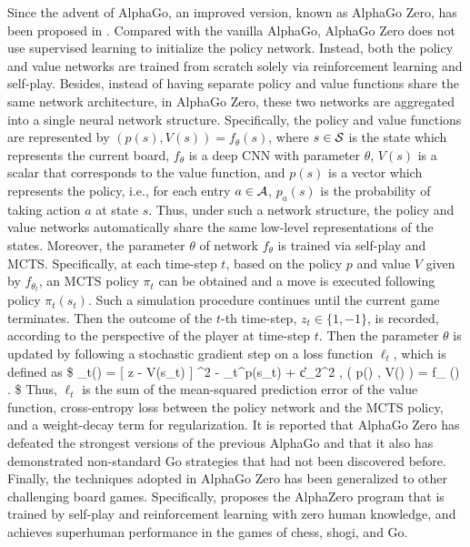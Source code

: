  Since the advent of AlphaGo, an improved version, known as  AlphaGo Zero, has been proposed in
  \cite{silver2017mastering}. 
  Compared with the vanilla AlphaGo, AlphaGo Zero does not use supervised learning to initialize the policy network. Instead, both the policy and value networks are trained from scratch solely via reinforcement learning and self-play. Besides, instead of having separate policy and value functions share the same network architecture, in AlphaGo Zero, these two networks are aggregated into a single neural network structure. Specifically, the policy and value functions  are represented by $(p(s), V(s)) = f_{\theta}(s)$, where $s \in {\mathcal{S}}$ is the state which represents the current board, $f_{\theta}$ is a deep CNN with parameter $\theta$, $V(s)$ is a scalar that  corresponds to the value function, and  $p(s)$ is a vector which represents the policy, i.e., for each entry $a \in \mathcal{A}$, $p_a(s) $ is the probability of taking action $a$ at state $s$. Thus, under such a network structure, the policy and value networks automatically share the same low-level representations of the states. Moreover, the parameter $\theta$ of network $f_{\theta}$ is trained via self-play and MCTS. Specifically, at each time-step $t$, based on the policy $p$ and value $V$ given by $f_{\theta_t}$, an MCTS policy $\pi_t$ can be obtained and a move is executed following policy $\pi_t(s_t)$. Such a simulation procedure continues  until the current  game terminates. Then the outcome of the $t$-th time-step, $z_t \in \{1, -1\}$,  is recorded, according to the perspective of the player at time-step $t$. Then the parameter $\theta$ is updated by following a stochastic gradient step on a loss function $\ell_t$, which is defined as 
  \$
  \ell_t(\theta) = [ z - V(s_t) ] ^2 - \pi_t^\top \log p(s_t) + c\cdot \|\theta \|_2^2 , \qquad \big ( p(\cdot) , V(\cdot)  \big) = f_{\theta} (\cdot) . 
  \$
  Thus, $\ell_t$ is the  sum of the mean-squared prediction error of the value function, cross-entropy loss between the policy network and the MCTS policy, and a weight-decay term for regularization. It is reported that 
  AlphaGo Zero has defeated the strongest versions of the previous AlphaGo and that it   also has demonstrated non-standard Go strategies  that had not been discovered  before. Finally, the techniques adopted in AlphaGo Zero has been generalized to other challenging board games. Specifically, 
\cite{silver2018general} proposes the AlphaZero program that is trained by self-play and reinforcement learning with zero human knowledge, and  achieves superhuman performance in the  games of chess, shogi, and Go. 

